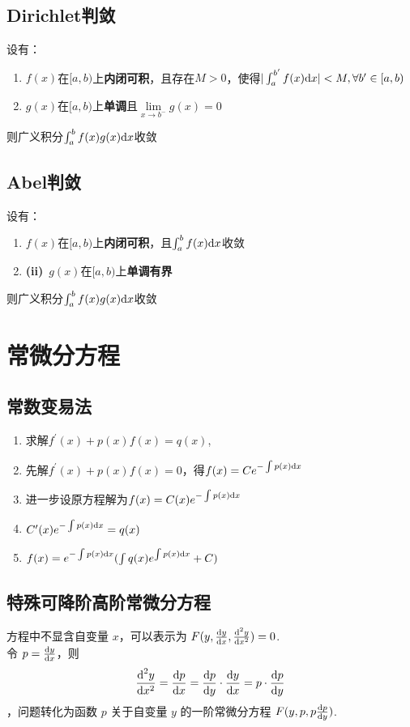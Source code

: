 \documentclass[./main.tex]{subfiles}
\begin{document}
\subsection{Dirichlet判敛}
\noindent 设有：
\begin{enumerate}
  \item $f(x)$在$[a,b)$上\textbf{内闭可积}，且存在$M>0$，使得$|\int_a^{b^{\prime}}f(x)\text{d}x|<M,\forall b^{\prime}\in[a,b)$
  \item $g(x)$在$[a,b)$上\textbf{单调}且$\lim\limits_{x\rightarrow b^-}g(x)=0$
\end{enumerate}
则广义积分$\int_a^bf(x)g(x)\text{d}x$收敛
\subsection{Abel判敛}
\noindent 设有：
\begin{enumerate}
  \item $f(x)$在$[a,b)$上\textbf{内闭可积}，且$\int_a^bf(x)\text{d}x$收敛
  \item \textbf{(ii)}\ $g(x)$在$[a,b)$上\textbf{单调有界}
\end{enumerate}
则广义积分$\int_a^bf(x)g(x)\text{d}x$收敛
\section{常微分方程}
\subsection{常数变易法}
\begin{enumerate}
  \item 求解$f^{\prime}(x)+p(x)f(x)=q(x)$,
  \item 先解$f^{\prime}(x)+p(x)f(x)=0$，得$f(x)=Ce^{-\int p(x)\text{d}x}$
  \item 进一步设原方程解为$f(x)=C(x)e^{-\int p(x)\text{d}x}$
  \item $C^{\prime}(x)e^{-\int p(x)\text{d}x}=q(x)$
  \item $f(x)=e^{-\int p(x)\text{d}x}(\int q(x)e^{\int p(x)\text{d}x}+C)$
\end{enumerate}
\subsection{特殊可降阶高阶常微分方程}
方程中不显含自变量 $x$，可以表示为 $F(y,\frac{\text{d}y}{\text{d}x},\frac{\text{d}^2y}{\text{d}x^2})=0$.\\
\indent 令 $p=\frac{\text{d}y}{\text{d}x}$，则 $$\frac{\text{d}^2y}{\text{d}x^2}=\frac{\text{d}p}{\text{d}x}=\frac{\text{d}p}{\text{d}y}\cdot\frac{\text{d}y}{\text{d}x}=p\cdot\frac{\text{d}p}{\text{d}y}$$，问题转化为函数 $p$ 关于自变量 $y$ 的一阶常微分方程 $F(y,p,p\frac{\text{d}p}{\text{d}y})$.
\end{document}

